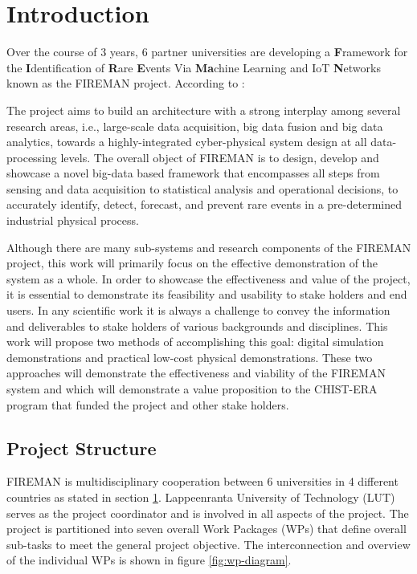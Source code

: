 \section{Introduction}
\label{ref_intro}

Over the course of 3 years, 6 partner universities are developing a \textbf{F}ramework for the \textbf{I}dentification of \textbf{R}are \textbf{E}vents Via \textbf{Ma}chine Learning and IoT \textbf{N}etworks known as the FIREMAN project. According to \cite{fireman-homepage}:
\begin{displayquote}
The project aims to build an architecture with a strong interplay among several research areas, i.e., large-scale data acquisition, big data fusion and big data analytics, towards a highly-integrated cyber-physical system design at all data-processing levels. The overall object of FIREMAN is to design, develop and showcase a novel big-data based framework that encompasses all steps from sensing and data acquisition to statistical analysis and operational decisions, to accurately identify, detect, forecast, and prevent rare events in a pre-determined industrial physical process.
\end{displayquote} 

Although there are many sub-systems and research components of the FIREMAN project, this work will primarily focus on the effective demonstration of the system as a whole. In order to showcase the effectiveness and value of the project, it is essential to demonstrate its feasibility and usability to stake holders and end users. In any scientific work it is always a challenge to convey the information and deliverables to stake holders of various backgrounds and disciplines. This work will propose two methods of accomplishing this goal: digital simulation demonstrations and practical low-cost physical demonstrations. These two approaches will demonstrate the effectiveness and viability of the FIREMAN system and which will demonstrate a value proposition to the CHIST-ERA program that funded the project and other stake holders. 

\subsection{Project Structure}

FIREMAN is multidisciplinary cooperation between 6 universities in 4 different countries as stated in section \ref{ref_intro}. Lappeenranta University of Technology (LUT) serves as the project coordinator and is involved in all aspects of the project. The project is partitioned into seven overall Work Packages (WPs) that define overall sub-tasks to meet the general project objective. The interconnection and overview of the individual WPs is shown in figure \ref{fig:wp-diagram}.

